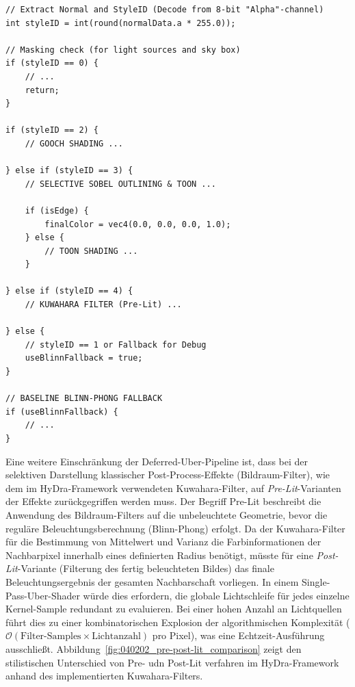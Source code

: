 \begin{listing}[htbp]
    \begin{verbatim}
// Extract Normal and StyleID (Decode from 8-bit "Alpha"-channel)
int styleID = int(round(normalData.a * 255.0));

// Masking check (for light sources and sky box)
if (styleID == 0) {
    // ...
    return;
}

if (styleID == 2) {
    // GOOCH SHADING ...

} else if (styleID == 3) {
    // SELECTIVE SOBEL OUTLINING & TOON ...

    if (isEdge) {
        finalColor = vec4(0.0, 0.0, 0.0, 1.0);
    } else {
        // TOON SHADING ...
    }

} else if (styleID == 4) {
    // KUWAHARA FILTER (Pre-Lit) ...

} else {
    // styleID == 1 or Fallback for Debug
    useBlinnFallback = true;
}

// BASELINE BLINN-PHONG FALLBACK
if (useBlinnFallback) {
    // ...
}
    \end{verbatim}
    \caption{GLSL-Pseudocode des Deferred-Uber Lighting-Passes im HyDra-Framework}
    \label{lst:deferred_branching_structure}
\end{listing}

Eine weitere Einschränkung der Deferred-Uber-Pipeline ist, dass bei der selektiven Darstellung klassischer
Post-Process-Effekte (Bildraum-Filter), wie dem im \ac{HyDra}-Framework verwendeten Kuwahara-Filter, auf
\textit{Pre-Lit}-Varianten der Effekte zurückgegriffen werden muss.
Der Begriff Pre-Lit beschreibt die Anwendung des Bildraum-Filters auf die unbeleuchtete Geometrie, bevor die reguläre
Beleuchtungsberechnung (Blinn-Phong) erfolgt.
Da der Kuwahara-Filter für die Bestimmung von Mittelwert und Varianz die Farbinformationen der Nachbarpixel innerhalb
eines definierten Radius benötigt, müsste für eine \textit{Post-Lit}-Variante (Filterung des fertig beleuchteten Bildes)
das finale Beleuchtungsergebnis der gesamten Nachbarschaft vorliegen.
In einem Single-Pass-Uber-Shader würde dies erfordern, die globale Lichtschleife für jedes einzelne Kernel-Sample
redundant zu evaluieren.
Bei einer hohen Anzahl an Lichtquellen führt dies zu einer kombinatorischen Explosion der algorithmischen Komplexität
($\mathcal{O}(\text{Filter-Samples} \times \text{Lichtanzahl})$ pro Pixel), was eine
Echtzeit-Ausführung ausschließt.
Abbildung~\ref{fig:040202_pre-post-lit_comparison} zeigt den stilistischen Unterschied von Pre- udn Post-Lit verfahren
im \ac{HyDra}-Framework anhand des implementierten Kuwahara-Filters.

